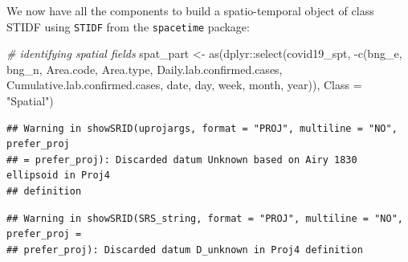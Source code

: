 \documentclass[
]{book}
\newenvironment{Shaded}{\begin{snugshade}}{\end{snugshade}}
\newcommand{\AttributeTok}[1]{\textcolor[rgb]{0.77,0.63,0.00}{#1}}
\newcommand{\CommentTok}[1]{\textcolor[rgb]{0.56,0.35,0.01}{\textit{#1}}}
\newcommand{\FunctionTok}[1]{\textcolor[rgb]{0.00,0.00,0.00}{#1}}
\newcommand{\NormalTok}[1]{#1}
\newcommand{\OtherTok}[1]{\textcolor[rgb]{0.56,0.35,0.01}{#1}}
\newcommand{\SpecialCharTok}[1]{\textcolor[rgb]{0.00,0.00,0.00}{#1}}
\newcommand{\StringTok}[1]{\textcolor[rgb]{0.31,0.60,0.02}{#1}}
\begin{document}
We now have all the components to build a spatio-temporal object of class STIDF using \texttt{STIDF} from the \texttt{spacetime} package:

\begin{Shaded}
\begin{Highlighting}[]
\CommentTok{\# identifying spatial fields}
\NormalTok{spat\_part }\OtherTok{\textless{}{-}} \FunctionTok{as}\NormalTok{(dplyr}\SpecialCharTok{::}\FunctionTok{select}\NormalTok{(covid19\_spt, }\SpecialCharTok{{-}}\FunctionTok{c}\NormalTok{(bng\_e, bng\_n, Area.code, Area.type, Daily.lab.confirmed.cases, Cumulative.lab.confirmed.cases, date, day, week, month, year)), }\AttributeTok{Class =} \StringTok{"Spatial"}\NormalTok{)}
\end{Highlighting}
\end{Shaded}

\begin{verbatim}
## Warning in showSRID(uprojargs, format = "PROJ", multiline = "NO", prefer_proj
## = prefer_proj): Discarded datum Unknown based on Airy 1830 ellipsoid in Proj4
## definition
\end{verbatim}

\begin{verbatim}
## Warning in showSRID(SRS_string, format = "PROJ", multiline = "NO", prefer_proj =
## prefer_proj): Discarded datum D_unknown in Proj4 definition
\end{verbatim}

\begin{Shaded}
\end{Shaded}
\end{document}
